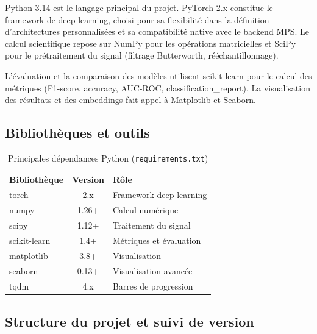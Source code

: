 Python 3.14 est le langage principal du projet. PyTorch 2.x constitue le framework de deep learning, choisi pour sa flexibilité dans la définition d'architectures personnalisées et sa compatibilité native avec le backend MPS. Le calcul scientifique repose sur NumPy pour les opérations matricielles et SciPy pour le prétraitement du signal (filtrage Butterworth, rééchantillonnage).

L'évaluation et la comparaison des modèles utilisent scikit-learn pour le calcul des métriques (F1-score, accuracy, AUC-ROC, classification\_report). La visualisation des résultats et des embeddings fait appel à Matplotlib et Seaborn.

\subsection{Bibliothèques et outils}

\begin{table}[H]
\centering
\small
\begin{tabularx}{0.88\textwidth}{|Y|c|Y|}
\hline
\textbf{Bibliothèque} & \textbf{Version} & \textbf{Rôle} \\
\hline
torch          & 2.x   & Framework deep learning \\
numpy          & 1.26+ & Calcul numérique \\
scipy          & 1.12+ & Traitement du signal \\
scikit-learn   & 1.4+  & Métriques et évaluation \\
matplotlib     & 3.8+  & Visualisation \\
seaborn        & 0.13+ & Visualisation avancée \\
tqdm           & 4.x   & Barres de progression \\
\hline
\end{tabularx}
\caption{Principales dépendances Python (\texttt{requirements.txt})}
\label{tab:dependencies}
\end{table}

\subsection{Structure du projet et suivi de version}

